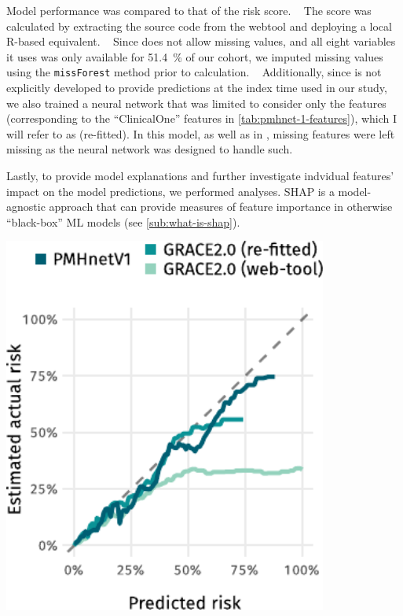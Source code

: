 Model performance was compared to that of the \graceii{} risk score.
~\autocite{foxShould2014}
The \graceii{} score was calculated by extracting the source code from the 
\graceii{} webtool and deploying a local R-based equivalent.
~\autocite{GRACE}
Since \graceii{} does not allow missing values, 
and all eight variables it uses was only available for \qty{51.4}{\percent} 
of our cohort, we imputed missing values 
using the \texttt{missForest} method prior to calculation.
~\autocite{stekhovenMissForest2012}
Additionally, since \graceii{} is not explicitly developed to provide
predictions at the index time used in our study, we also trained a 
neural network that was limited to consider only the \graceii{} features
(corresponding to the \enquote{ClinicalOne} features in 
\cref{tab:pmhnet-1-features}), which I will refer to as \graceii{} (re-fitted).
In this model, as well as in , missing features were left 
missing as the neural network was designed to handle such.

Lastly, to provide model explanations and further investigate indvidual
features' impact on the model predictions, we performed  
analyses. \ac{SHAP} is a model-agnostic approach that can provide
measures of feature importance in otherwise \enquote{black-box} \ac{ML} 
models (see \cref{sub:what-is-shap}).


\begin{marginfigure}
    \centering
    \includegraphics[trim=3mm 0 0 0, width=0.8\textwidth]{graphics/pmhnetv1-performance-curves.pdf}
    \caption[Calibration curves for  and \acs{GRACE} 2.0]{%
        Calibration curve for the  model and
        the \acs{GRACE} 2.0 reference models at a prediction
        horizon of three years.%
    }
    \label{fig:pmhv1-curves}
\end{marginfigure}%

